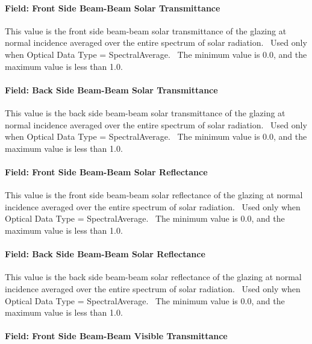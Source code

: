 \paragraph{Field: Front Side Beam-Beam Solar Transmittance}\label{field-front-side-beam-beam-solar-transmittance}

This value is the front side beam-beam solar transmittance of the glazing at normal incidence averaged over the entire spectrum of solar radiation.~ Used only when Optical Data Type = SpectralAverage.~ The minimum value is 0.0, and the maximum value is less than 1.0.

\paragraph{Field: Back Side Beam-Beam Solar Transmittance}\label{field-back-side-beam-beam-solar-transmittance}

This value is the back side beam-beam solar transmittance of the glazing at normal incidence averaged over the entire spectrum of solar radiation.~ Used only when Optical Data Type = SpectralAverage.~ The minimum value is 0.0, and the maximum value is less than 1.0.

\paragraph{Field: Front Side Beam-Beam Solar Reflectance}\label{field-front-side-beam-beam-solar-reflectance}

This value is the front side beam-beam solar reflectance of the glazing at normal incidence averaged over the entire spectrum of solar radiation.~ Used only when Optical Data Type = SpectralAverage.~ The minimum value is 0.0, and the maximum value is less than 1.0.

\paragraph{Field: Back Side Beam-Beam Solar Reflectance}\label{field-back-side-beam-beam-solar-reflectance}

This value is the back side beam-beam solar reflectance of the glazing at normal incidence averaged over the entire spectrum of solar radiation.~ Used only when Optical Data Type = SpectralAverage.~ The minimum value is 0.0, and the maximum value is less than 1.0.

\paragraph{Field: Front Side Beam-Beam Visible Transmittance}\label{field-front-side-beam-beam-visible-transmittance}

